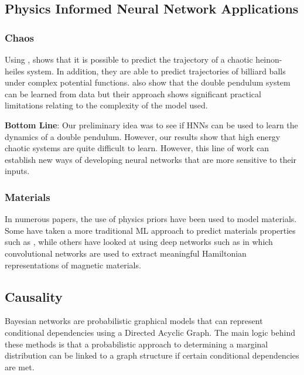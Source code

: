 \documentclass{article}
\begin{document}
\subsection{Physics Informed Neural Network Applications}

\subsubsection{Chaos}

Using , \cite{choudhary_physics_2019} shows that it is possible to predict the trajectory of a chaotic heinon-heiles system. In addition, they are able to predict trajectories of billiard balls under complex potential functions. \cite{cranmer_lagrangian_2020} also show that the double pendulum system can be learned from data but their approach shows significant practical limitations relating to the complexity of the model used.

\textbf{Bottom Line}: Our preliminary idea was to see if HNNs can be used to learn the dynamics of a double pendulum. However, our  results show that high energy chaotic systems are quite difficult to learn. However, this line of work can establish new ways of developing neural networks that are more sensitive to their inputs. 


\subsubsection{Materials}

In numerous papers, \cite{rupp_fast_2012,witkoskie_neural_2005,pukrittayakamee_simultaneous_2009,smith_ani-1_2017,yao_tensormol-01_2018} the use of physics priors have been used to model materials. Some have taken a more traditional ML approach to predict materials properties such as \cite{rupp_fast_2012}, while others have looked at using deep networks such as \cite{wang_machine_2019} in which convolutional networks are used to extract meaningful Hamiltonian representations of magnetic materials.


\subsection{Causality}

Bayesian networks are probabilistic graphical models that can represent conditional dependencies using a Directed Acyclic Graph. The main logic behind these methods is that a probabilistic approach to determining a marginal distribution can be linked to a graph structure if certain conditional dependencies are met. 
\end{document}
